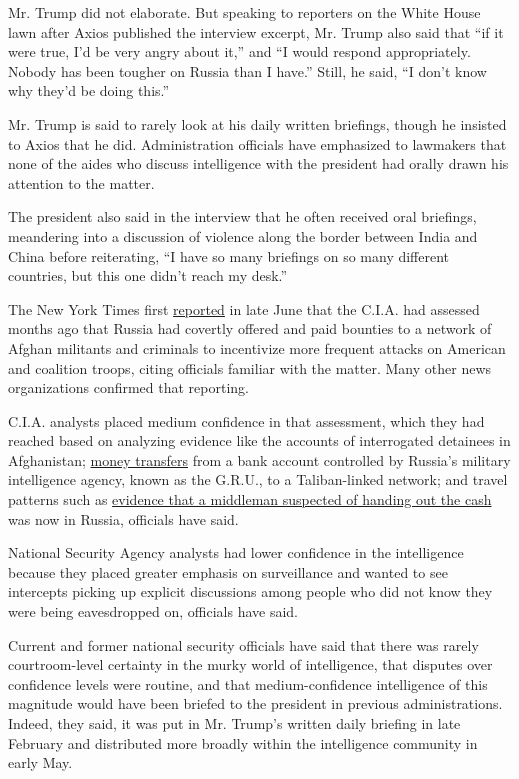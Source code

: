 Mr. Trump did not elaborate. But speaking to reporters on the White
House lawn after Axios published the interview excerpt, Mr. Trump also
said that ``if it were true, I'd be very angry about it,'' and ``I would
respond appropriately. Nobody has been tougher on Russia than I have.''
Still, he said, ``I don't know why they'd be doing this.''

Mr. Trump is said to rarely look at his daily written briefings, though
he insisted to Axios that he did. Administration officials have
emphasized to lawmakers that none of the aides who discuss intelligence
with the president had orally drawn his attention to the matter.

The president also said in the interview that he often received oral
briefings, meandering into a discussion of violence along the border
between India and China before reiterating, ``I have so many briefings
on so many different countries, but this one didn't reach my desk.''

The New York Times first
\href{https://www.nytimes.com/2020/06/26/us/politics/russia-afghanistan-bounties.html}{reported}
in late June that the C.I.A. had assessed months ago that Russia had
covertly offered and paid bounties to a network of Afghan militants and
criminals to incentivize more frequent attacks on American and coalition
troops, citing officials familiar with the matter. Many other news
organizations confirmed that reporting.

C.I.A. analysts placed medium confidence in that assessment, which they
had reached based on analyzing evidence like the accounts of
interrogated detainees in Afghanistan;
\href{https://www.nytimes.com/2020/06/30/us/politics/russian-bounties-afghanistan-intelligence.html}{money
transfers} from a bank account controlled by Russia's military
intelligence agency, known as the G.R.U., to a Taliban-linked network;
and travel patterns such as
\href{https://www.nytimes.com/2020/07/01/world/asia/afghan-russia-bounty-middleman.html}{evidence
that a middleman suspected of handing out the cash} was now in Russia,
officials have said.

National Security Agency analysts had lower confidence in the
intelligence because they placed greater emphasis on surveillance and
wanted to see intercepts picking up explicit discussions among people
who did not know they were being eavesdropped on, officials have said.

Current and former national security officials have said that there was
rarely courtroom-level certainty in the murky world of intelligence,
that disputes over confidence levels were routine, and that
medium-confidence intelligence of this magnitude would have been briefed
to the president in previous administrations. Indeed, they said, it was
put in Mr. Trump's written daily briefing in late February and
distributed more broadly within the intelligence community in early May.

